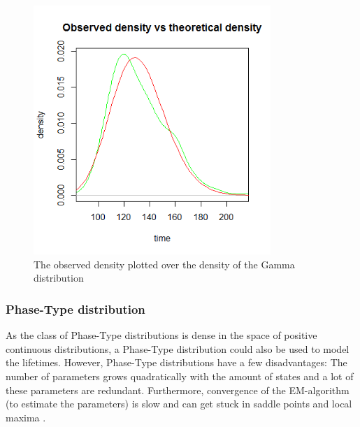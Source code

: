 \begin{figure}[H]
\centering
\includegraphics[width=0.8\textwidth]{Plots/LifetimeDensity.png}
\caption{The observed density plotted over the density of the Gamma distribution}
\end{figure}



\subsubsection{Phase-Type distribution}
As the class of Phase-Type distributions is dense in the space of positive continuous distributions, a Phase-Type distribution could also be used to model the lifetimes. However, Phase-Type distributions have a few disadvantages: The number of parameters grows quadratically with the amount of states and a lot of these parameters are redundant. Furthermore, convergence of the EM-algorithm (to estimate the parameters) is slow and can get stuck in saddle points and local maxima \cite{Asmussen1996}.

